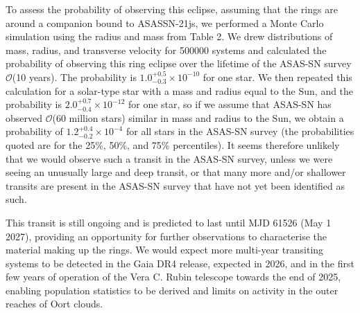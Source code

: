 \documentclass[letter]{aa} %
\begin{document}
To assess the probability of observing this eclipse, assuming that the rings are around a companion bound to ASASSN-21js, we performed a Monte Carlo simulation using the radius and mass from Table 2.
%
We drew distributions of mass, radius, and transverse velocity for 500000 systems and calculated the probability of observing this ring eclipse over the lifetime of the ASAS-SN survey $\mathcal{O}$(10 years).
%
The probability is $1.0^{+0.5}_{-0.3}\times10^{-10}$ for one star.
%
We then repeated this calculation for a solar-type star with a mass and radius equal to the Sun, and the probability is $2.0^{+0.7}_{-0.4}\times10^{-12}$ for one star, so if we assume that ASAS-SN has observed $\mathcal{O}$(60 million stars) similar in mass and radius to the Sun, we obtain a probability of $1.2^{+0.4}_{-0.2}\times10^{-4}$ for all stars in the ASAS-SN survey (the probabilities quoted are for the 25\%, 50\%, and 75\% percentiles).
%
It seems therefore unlikely that we would observe such a transit in the ASAS-SN survey, unless we were seeing an unusually large and deep transit, or that many more and/or shallower transits are present in the ASAS-SN survey that have not yet been identified as such.

This transit is still ongoing and is predicted to last until MJD 61526 (May 1 2027), providing an opportunity for further observations to characterise the material making up the rings.
%
We would expect more multi-year transiting systems to be detected in the Gaia DR4 release, expected in 2026, and in the first few years of operation of the Vera C. Rubin telescope towards the end of 2025, enabling population statistics to be derived and limits on activity in the outer reaches of Oort clouds.
\end{document}
